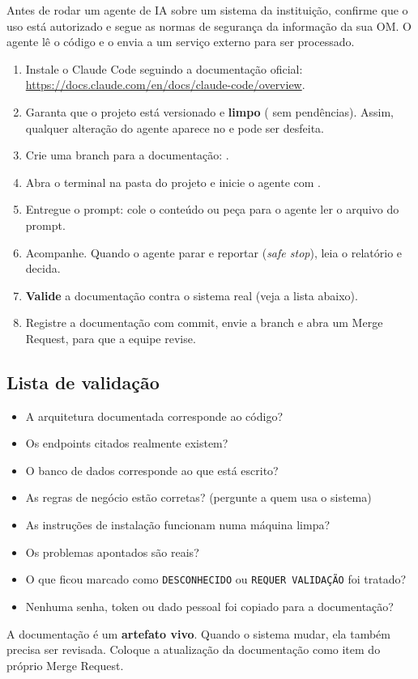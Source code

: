 \begin{atencao}
Antes de rodar um agente de IA sobre um sistema da instituição, confirme que o uso está autorizado e segue as normas de segurança da informação da sua OM. O agente lê o código e o envia a um serviço externo para ser processado.
\end{atencao}

\begin{enumerate}
  \item Instale o Claude Code seguindo a documentação oficial: \url{https://docs.claude.com/en/docs/claude-code/overview}.
  \item Garanta que o projeto está versionado e \textbf{limpo} ( sem pendências). Assim, qualquer alteração do agente aparece no  e pode ser desfeita.
  \item Crie uma branch para a documentação: .
  \item Abra o terminal na pasta do projeto e inicie o agente com .
  \item Entregue o prompt: cole o conteúdo ou peça para o agente ler o arquivo do prompt.
  \item Acompanhe. Quando o agente parar e reportar (\emph{safe stop}), leia o relatório e decida.
  \item \textbf{Valide} a documentação contra o sistema real (veja a lista abaixo).
  \item Registre a documentação com commit, envie a branch e abra um Merge Request, para que a equipe revise.
\end{enumerate}

\subsection*{Lista de validação}

\begin{itemize}
  \item A arquitetura documentada corresponde ao código?
  \item Os endpoints citados realmente existem?
  \item O banco de dados corresponde ao que está escrito?
  \item As regras de negócio estão corretas? (pergunte a quem usa o sistema)
  \item As instruções de instalação funcionam numa máquina limpa?
  \item Os problemas apontados são reais?
  \item O que ficou marcado como \texttt{DESCONHECIDO} ou \texttt{REQUER VALIDAÇÃO} foi tratado?
  \item Nenhuma senha, token ou dado pessoal foi copiado para a documentação?
\end{itemize}

\begin{dica}
A documentação é um \textbf{artefato vivo}. Quando o sistema mudar, ela também precisa ser revisada. Coloque a atualização da documentação como item do próprio Merge Request.
\end{dica}
